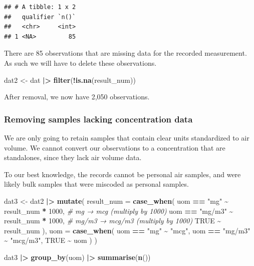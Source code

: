 \documentclass[
]{article}
\newenvironment{Shaded}{\begin{snugshade}}{\end{snugshade}}
\newcommand{\AttributeTok}[1]{\textcolor[rgb]{0.13,0.29,0.53}{#1}}
\newcommand{\CommentTok}[1]{\textcolor[rgb]{0.56,0.35,0.01}{\textit{#1}}}
\newcommand{\ConstantTok}[1]{\textcolor[rgb]{0.56,0.35,0.01}{#1}}
\newcommand{\DecValTok}[1]{\textcolor[rgb]{0.00,0.00,0.81}{#1}}
\newcommand{\FunctionTok}[1]{\textcolor[rgb]{0.13,0.29,0.53}{\textbf{#1}}}
\newcommand{\NormalTok}[1]{#1}
\newcommand{\OtherTok}[1]{\textcolor[rgb]{0.56,0.35,0.01}{#1}}
\newcommand{\SpecialCharTok}[1]{\textcolor[rgb]{0.81,0.36,0.00}{\textbf{#1}}}
\newcommand{\StringTok}[1]{\textcolor[rgb]{0.31,0.60,0.02}{#1}}
\begin{document}
\begin{verbatim}
## # A tibble: 1 x 2
##   qualifier `n()`
##   <chr>     <int>
## 1 <NA>         85
\end{verbatim}

There are 85 observations that are missing data for the recorded
measurement. As such we will have to delete these observations.

\begin{Shaded}
\begin{Highlighting}[]
\NormalTok{dat2 }\OtherTok{\textless{}{-}}\NormalTok{ dat }\SpecialCharTok{|\textgreater{}} 
  \FunctionTok{filter}\NormalTok{(}\SpecialCharTok{!}\FunctionTok{is.na}\NormalTok{(result\_num))}
\end{Highlighting}
\end{Shaded}

After removal, we now have 2,050 observations.

\subsubsection{Removing samples lacking concentration
data}\label{removing-samples-lacking-concentration-data}

We are only going to retain samples that contain clear units
standardized to air volume. We cannot convert our observations to a
concentration that are standalones, since they lack air volume data.

To our best knowledge, the records cannot be personal air samples, and
were likely bulk samples that were miscoded as personal samples.

\begin{Shaded}
\begin{Highlighting}[]
\NormalTok{dat3 }\OtherTok{\textless{}{-}}\NormalTok{ dat2 }\SpecialCharTok{|\textgreater{}} 
    \FunctionTok{mutate}\NormalTok{(}
    \AttributeTok{result\_num =} \FunctionTok{case\_when}\NormalTok{(}
\NormalTok{      uom }\SpecialCharTok{==} \StringTok{"mg"} \SpecialCharTok{\textasciitilde{}}\NormalTok{ result\_num }\SpecialCharTok{*} \DecValTok{1000}\NormalTok{,      }\CommentTok{\# mg → mcg (multiply by 1000)}
\NormalTok{      uom }\SpecialCharTok{==} \StringTok{"mg/m3"} \SpecialCharTok{\textasciitilde{}}\NormalTok{ result\_num }\SpecialCharTok{*} \DecValTok{1000}\NormalTok{,   }\CommentTok{\# mg/m3 → mcg/m3 (multiply by 1000)}
      \ConstantTok{TRUE} \SpecialCharTok{\textasciitilde{}}\NormalTok{ result\_num}
\NormalTok{    ),}
    \AttributeTok{uom =} \FunctionTok{case\_when}\NormalTok{(}
\NormalTok{      uom }\SpecialCharTok{==} \StringTok{"mg"} \SpecialCharTok{\textasciitilde{}} \StringTok{"mcg"}\NormalTok{,}
\NormalTok{      uom }\SpecialCharTok{==} \StringTok{"mg/m3"} \SpecialCharTok{\textasciitilde{}} \StringTok{"mcg/m3"}\NormalTok{,}
      \ConstantTok{TRUE} \SpecialCharTok{\textasciitilde{}}\NormalTok{ uom}
\NormalTok{    )}
\NormalTok{  ) }

\NormalTok{dat3 }\SpecialCharTok{|\textgreater{}} 
  \FunctionTok{group\_by}\NormalTok{(uom) }\SpecialCharTok{|\textgreater{}} 
  \FunctionTok{summarise}\NormalTok{(}\FunctionTok{n}\NormalTok{())}
\end{Highlighting}
\end{Shaded}
\end{document}
